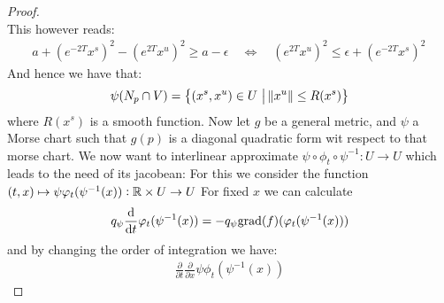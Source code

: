 \begin{proof}
\begin{equation}
\end{equation}
This however reads: 
\begin{align*}
     a+{( e^{-2T}x^s)}^2-(e^{2T}x^u)^2  \geq a-\epsilon  \quad \Leftrightarrow \quad (e^{2T}x^u)^2 \leq \epsilon+ {( e^{-2T}x^s)}^2 \, 
\end{align*}And hence we have that:
\begin{equation*}
    \psi(N_p\cap V)=\left\{(x^s,x^u)\in U ~\middle|~\norm{x^u}\leq R(x^s)\right\}
\end{equation*} where $R(x^s)$ is a smooth function. Now let $g$ be a general metric, and $\psi$ a Morse chart such that $g(p)$ is a diagonal quadratic form wit respect to that morse chart. We now want to interlinear approximate  $\psi\circ \phi_t \circ \psi^{-1}:U\to U$ which leads to the need of its jacobean:
For this we consider the function $ (t,x)\mapsto \psi \varphi_t(\psi^{-1}(x)):\mathbb{R} \times U \to U$ For fixed $x$ we can calculate
\begin{align*}
	q_{\psi}\frac{\mathop{}\!\mathrm{d}}{\mathop{}\!\mathrm{d} t} \varphi_t(\psi^{-1}(x))=-q_{\psi} \mathrm{grad}(f)(\varphi_t(\psi^{-1}(x)))
\end{align*} and by changing the order of integration we have:
\begin{align*}
	\frac{\partial}{\partial t}  \frac{\partial}{\partial x}  \psi \phi_t(\psi^{-1}(x))
\end{align*}

\end{proof}


